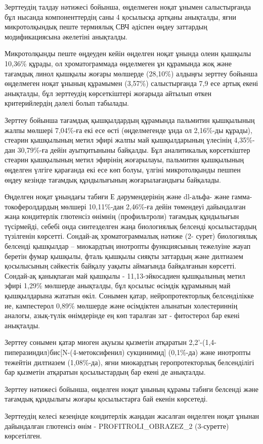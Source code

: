 \begin{multicols}{2}

Зерттеудің талдау нәтижесі бойынша, өңделмеген ноқат ұнымен
салыстырғанда бұл нысанда компоненттердің саны 4 қосылысқа артқаны
анықталды, яғни микротолқындық пеште термиялық СВЧ әдіспен өңдеу
заттардың модификациясына әкелетіні анықталды.

Микротолқынды пеште өңдеуден кейін өңделген ноқат ұнында олеин қышқылы
10,36\% құрады, ол хроматограммада өңделмеген ұн құрамында жоқ және
тағамдық линол қышқылы жоғары мөлшерде (28,10\%) алдыңғы зерттеу бойынша
өңделмеген ноқат ұнының құрамымен (3,57\%) салыстырғанда 7,9 есе артық
екені анықталды, бұл зерттеудің көрсеткіштері жоғарыда айтылып өткен
критерийлердің дәлелі болып табылады.

Зерттеу бойынша тағамдық қышқылдардың құрамында пальмитин қышқылының
жалпы мөлшері 7,04\%-ға екі есе өсті (өңделмегенде ұнда ол 2,16\%-ды
құрады), стеарин қышқылының метил эфирі жалпы май қышқылдарының үлесінің
4,35\%-дан 30,79\%-ға дейін ауытқитыныны байқалды. Бұл аналитикалық
көрсеткіштер стеарин қышқылының метил эфирінің жоғарылауы, пальмитин
қышқылының өңделген үлгіге қарағанда екі есе көп болуы, үлгіні
микротолқынды пешпен өңдеу кезінде тағамдық құндылығының жоғарылағандығы
байқалады.

Өңделген ноқат ұнындағы табиғи Е дәрумендерінің және dl-альфа- және
гамма-токоферолдардың мөлшері 10,11\%-дан 2,46\%-ға дейін төмендеуі
дайындалған жаңа кондитерлік глютенсіз өнімнің (профильтроли) тағамдық
құндылығын түсірмейді, себебі онда синтезделген жаңа биологиялық
белсенді қосылыстардың түзілгенін көрсетті. Сондай-ақ хроматограммалық
нәтиже (2- сурет) биологиялық белсенді қышқылдар -- миокардтың инотропты
функциясының тежелуіне жауап беретін фумар қышқылы, фталь қышқылы сияқты
заттардың және дилтиазем қосылысының сәйкестік байқалу уақыты аймағында
байқалғанын көрсетті. Сондай-ақ қанықпаған май қышқылы -
11,13-эйкосадиен қышқылының метил эфирі 1,29\% мөлшерде анықталды, бұл
қосылыс өсімдік құрамының май қышқылдарына жататын өкіл. Сонымен қатар,
нейропротекторлық белсенділікке ие, кампестерол 0,89\% мөлшерде және
өсімдіктен алынатын холестериннің аналогы, азық-түлік өнімдерінде ең көп
таралған зат - фитостерол бар екені анықталды.

Зерттеу сонымен қатар миоген ақуызы қызметін атқаратын
2,2'-(1,4-пиперазиндил)бис{[}N-(4-метоксифенил)
сукцинимид{]} (0,1\%-да) және инотропты тежейтін дилтиазем (1,08\%-да),
яғни миокардтың геропротекторлық белсенділігі бар қызметін атқаратын
қосылыстардың бар екені де анықталды.

Зерттеу нәтижесі бойынша, өңделген ноқат ұнының құрамы табиғи белсенді
және тағамдық құндылығы жоғары қосылыстарға бай екенін көрсетеді.

Зерттеудің келесі кезеңінде кондитерлік жаңадан жасалған өңделген ноқат
ұнынан дайындалған глютенсіз өнім - PROFITROLI\_OBRAZEZ\_2 (3-суретте)
көрсетілген.
\end{multicols}

